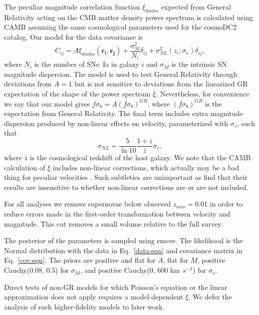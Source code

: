 \documentclass{aastex62}   	%
\begin{document}
The peculiar magnitude correlation
function $\xi_{\delta m \delta m}$ \citep{2011ApJ...741...67D,2015JCAP...12..033H} expected from General Relativity acting on the CMB
matter density power spectrum is calculated using CAMB \citep{Lewis:2002ah}  assuming the same
cosmological parameters used for the cosmoDC2 catalog.  Our model for the data covariance
is
\begin{equation}
C_{ij} = A\xi_{\delta m \delta m}(\mathbf{r_i},\mathbf{r_j}) + \frac{\sigma_M^2}{N_i} \delta_{ij} + \sigma^2_{NL}(z_i;\sigma_{v})\delta_{ij},
\label{cov:eqn}
\end{equation}
where $N_i$ is the number of SNe~Ia in galaxy $i$ and $\sigma_M$ is the intrinsic SN magnitude dispersion.
The model is used to test General Relativity through deviations from $A=1$ but is not sensitive to deviations
from the linearized GR expectation of the shape of the power spectrum 
$\xi$.
Nevertheless, for
convenience we say that our model gives $f\sigma_8 = A (f\sigma_8)^{GR}$, where $(f\sigma_8)^{GR}$ is the expectation
from General Relativity. 
The final term includes extra magnitude dispersion produced by non-linear effects on velocity, parameterized with $\sigma_{v}$, such that
\begin{equation}
\sigma_{NL} = \frac{5}{\ln{10}} \frac{1+\bar{z}}{\bar{z}} \sigma_v,
\end{equation}
where $\bar{z}$ is the cosmological redshift of the host galaxy.
We note that the CAMB calculation of $\xi$ includes non-linear corrections, which actually may be a bad thing for peculiar velocities \citep{2015MNRAS.454.3920H}. 
Such subtleties are unimportant as \citet{2015JCAP...12..033H} find that their results are insensitive to whether non-linear corrections are or are not included.

For all analyses we remove supernovae below observed $z_{min}=0.01$ in order to
reduce errors made in the first-order transformation between velocity and
magnitude.  This cut removes a  small volume relative to the full survey.

The posterior of the parameters is sampled using emcee.  The likelihood is the Normal distribution with the data in Eq.~\ref{data:eqn} and
covariance matrix in Eq.~\ref{cov:eqn}.
The priors are positive and flat for $A$, flat for $M$, positive Cauchy(0.08, 0.5) for $\sigma_M$, and  positive Cauchy(0, 600 km~s$^{-1}$) for $\sigma_{v}$.

Direct tests of non-GR models for which Poisson's equation or the linear approximation
does not apply requires a model-dependent $\xi$.  We defer the analysis of such higher-fidelity models to later work. 
\end{document}
